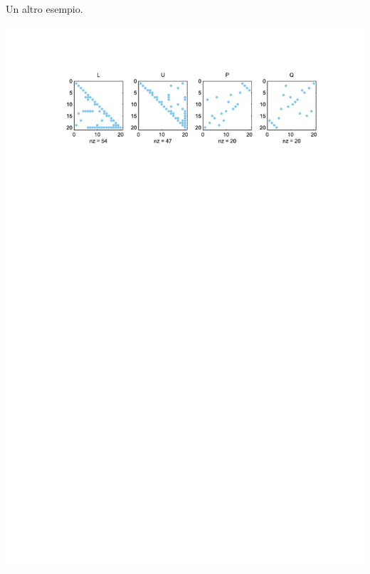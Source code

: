 \begin{examplebox}
    \highspace
    Un altro esempio.

    \highspace
    \centering
    \includegraphics[width=\textwidth]{img/fill_in_4.pdf}
\end{examplebox}
